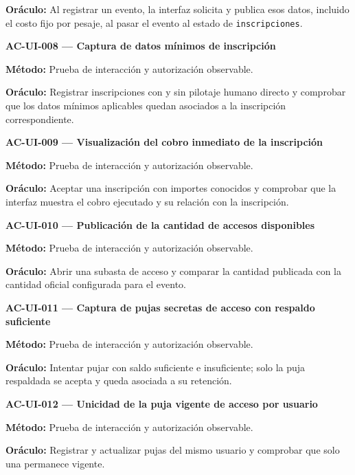 \documentclass[10pt,letterpaper]{article}
\begin{document}
\textbf{Oráculo:} Al registrar un evento, la interfaz solicita y publica esos datos, incluido el costo fijo por pesaje, al pasar el evento al estado de \texttt{inscripciones}.\par\vspace{0.45em}
\noindent\textbf{AC-UI-008 --- Captura de datos mínimos de inscripción}\par
\textbf{Método:} Prueba de interacción y autorización observable.\par
\textbf{Oráculo:} Registrar inscripciones con y sin pilotaje humano directo y comprobar que los datos mínimos aplicables quedan asociados a la inscripción correspondiente.\par\vspace{0.45em}
\noindent\textbf{AC-UI-009 --- Visualización del cobro inmediato de la inscripción}\par
\textbf{Método:} Prueba de interacción y autorización observable.\par
\textbf{Oráculo:} Aceptar una inscripción con importes conocidos y comprobar que la interfaz muestra el cobro ejecutado y su relación con la inscripción.\par\vspace{0.45em}
\noindent\textbf{AC-UI-010 --- Publicación de la cantidad de accesos disponibles}\par
\textbf{Método:} Prueba de interacción y autorización observable.\par
\textbf{Oráculo:} Abrir una subasta de acceso y comparar la cantidad publicada con la cantidad oficial configurada para el evento.\par\vspace{0.45em}
\noindent\textbf{AC-UI-011 --- Captura de pujas secretas de acceso con respaldo suficiente}\par
\textbf{Método:} Prueba de interacción y autorización observable.\par
\textbf{Oráculo:} Intentar pujar con saldo suficiente e insuficiente; solo la puja respaldada se acepta y queda asociada a su retención.\par\vspace{0.45em}
\noindent\textbf{AC-UI-012 --- Unicidad de la puja vigente de acceso por usuario}\par
\textbf{Método:} Prueba de interacción y autorización observable.\par
\textbf{Oráculo:} Registrar y actualizar pujas del mismo usuario y comprobar que solo una permanece vigente.\par\vspace{0.45em}
\end{document}
